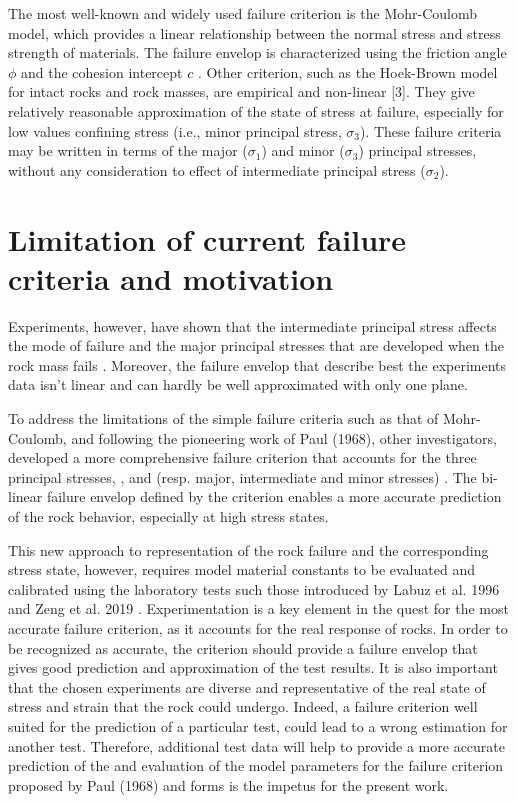 The most well-known and widely used failure criterion is the Mohr-Coulomb model, which provides a linear relationship between the normal stress and stress strength of materials. The failure envelop is characterized using the friction angle $\phi$ and the cohesion intercept $c$ \cite{Jaeger1979}. Other criterion, such as the Hoek-Brown model for intact rocks and rock masses, are empirical and non-linear [3]. They give relatively reasonable approximation of the state of stress at failure, especially for low values confining stress (i.e., minor principal stress, $\sigma_3$). These failure criteria may be written in terms of the major ($\sigma_1$) and minor ($\sigma_3$) principal stresses, without any consideration to effect of intermediate principal stress ($\sigma_2$). 

\section{Limitation of current failure criteria and motivation}


Experiments, however, have shown that the intermediate principal stress affects the mode of failure and the major principal stresses that are developed when the rock mass fails \cite{Labuz2018,Labuz1996, Zeng2019,Makhnenko2013}. Moreover, the failure envelop that describe best the experiments data isn’t linear and can hardly be well approximated with only one plane. 

To address the limitations of the simple failure criteria such as that of Mohr-Coulomb, and following the pioneering work of Paul (1968), other investigators, developed a more comprehensive failure criterion that accounts for the three principal stresses, ,  and  (resp. major, intermediate and minor stresses) \cite{Paul1968,Meyer2013}. The bi-linear failure envelop defined by the criterion enables a more accurate prediction of the rock behavior, especially at high stress states. 

This new approach to representation of the rock failure and the corresponding stress state, however, requires model material constants to be evaluated and calibrated using the laboratory tests such those introduced by Labuz et al. 1996 \cite{Labuz1996} and Zeng et al. 2019 \cite{Zeng2019}. Experimentation is a key element in the quest for the most accurate failure criterion, as it accounts for the real response of rocks. In order to be recognized as accurate, the criterion should provide a failure envelop that gives good prediction and approximation of the test results. It is also important that the chosen experiments are diverse and representative of the real state of stress and strain that the rock could undergo. Indeed, a failure criterion well suited for the prediction of a particular test, could lead to a wrong estimation for another test. Therefore, additional test data will help to provide a more accurate prediction of the and evaluation of the model parameters for the failure criterion proposed by Paul (1968) \cite{Paul1968} and forms is the impetus for the present work.

